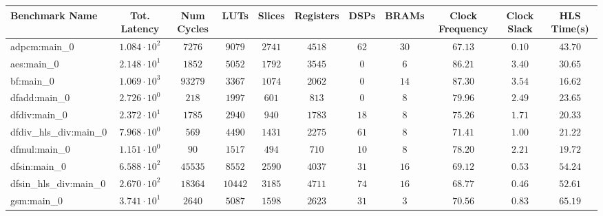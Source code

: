 \begin{tabular}{|l|c|c|c|c|c|c|c|c|c|c|}
\hline
Benchmark Name          & Tot. Latency           & Num Cycles & LUTs      & Slices    & Registers & DSPs    & BRAMs   & Clock Frequency & Clock Slack & HLS Time(s) \\
\hline
adpcm:main\_0           & $ 1.084 \cdot 10^{2} $ & $ 7276   $ & $ 9079  $ & $ 2741  $ & $ 4518  $ & $ 62  $ & $ 30  $ & $ 67.13       $ & $ 0.10    $ & $ 43.70   $ \\
aes:main\_0             & $ 2.148 \cdot 10^{1} $ & $ 1852   $ & $ 5052  $ & $ 1792  $ & $ 3545  $ & $ 0   $ & $ 6   $ & $ 86.21       $ & $ 3.40    $ & $ 30.65   $ \\
bf:main\_0              & $ 1.069 \cdot 10^{3} $ & $ 93279  $ & $ 3367  $ & $ 1074  $ & $ 2062  $ & $ 0   $ & $ 14  $ & $ 87.30       $ & $ 3.54    $ & $ 16.62   $ \\
dfadd:main\_0           & $ 2.726 \cdot 10^{0} $ & $ 218    $ & $ 1997  $ & $ 601   $ & $ 813   $ & $ 0   $ & $ 8   $ & $ 79.96       $ & $ 2.49    $ & $ 23.65   $ \\
dfdiv:main\_0           & $ 2.372 \cdot 10^{1} $ & $ 1785   $ & $ 2940  $ & $ 940   $ & $ 1783  $ & $ 18  $ & $ 8   $ & $ 75.26       $ & $ 1.71    $ & $ 20.33   $ \\
dfdiv\_hls\_div:main\_0 & $ 7.968 \cdot 10^{0} $ & $ 569    $ & $ 4490  $ & $ 1431  $ & $ 2275  $ & $ 61  $ & $ 8   $ & $ 71.41       $ & $ 1.00    $ & $ 21.22   $ \\
dfmul:main\_0           & $ 1.151 \cdot 10^{0} $ & $ 90     $ & $ 1517  $ & $ 494   $ & $ 710   $ & $ 10  $ & $ 8   $ & $ 78.20       $ & $ 2.21    $ & $ 19.72   $ \\
dfsin:main\_0           & $ 6.588 \cdot 10^{2} $ & $ 45535  $ & $ 8552  $ & $ 2590  $ & $ 4037  $ & $ 31  $ & $ 16  $ & $ 69.12       $ & $ 0.53    $ & $ 54.24   $ \\
dfsin\_hls\_div:main\_0 & $ 2.670 \cdot 10^{2} $ & $ 18364  $ & $ 10442 $ & $ 3185  $ & $ 4711  $ & $ 74  $ & $ 16  $ & $ 68.77       $ & $ 0.46    $ & $ 52.61   $ \\
gsm:main\_0             & $ 3.741 \cdot 10^{1} $ & $ 2640   $ & $ 5087  $ & $ 1598  $ & $ 2623  $ & $ 31  $ & $ 3   $ & $ 70.56       $ & $ 0.83    $ & $ 65.19   $ \\

\end{tabular}
